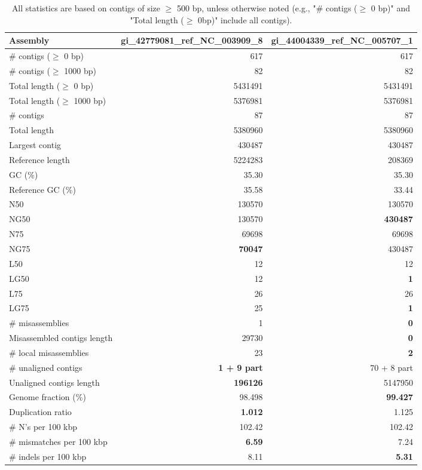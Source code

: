 \documentclass[12pt,a4paper]{article}
\begin{document}
\begin{table}[ht]
\begin{center}
\caption{All statistics are based on contigs of size $\geq$ 500 bp, unless otherwise noted (e.g., "\# contigs ($\geq$ 0 bp)" and "Total length ($\geq$ 0bp)" include all contigs).}
\begin{tabular}{|l*{2}{|r}|}
\hline
Assembly & gi\_42779081\_ref\_NC\_003909\_8 & gi\_44004339\_ref\_NC\_005707\_1 \\ \hline
\# contigs ($\geq$ 0 bp) & 617 & 617 \\ \hline
\# contigs ($\geq$ 1000 bp) & 82 & 82 \\ \hline
Total length ($\geq$ 0 bp) & 5431491 & 5431491 \\ \hline
Total length ($\geq$ 1000 bp) & 5376981 & 5376981 \\ \hline
\# contigs & 87 & 87 \\ \hline
Total length & 5380960 & 5380960 \\ \hline
Largest contig & 430487 & 430487 \\ \hline
Reference length & 5224283 & 208369 \\ \hline
GC (\%) & 35.30 & 35.30 \\ \hline
Reference GC (\%) & 35.58 & 33.44 \\ \hline
N50 & 130570 & 130570 \\ \hline
NG50 & 130570 & {\bf 430487} \\ \hline
N75 & 69698 & 69698 \\ \hline
NG75 & {\bf 70047} & 430487 \\ \hline
L50 & 12 & 12 \\ \hline
LG50 & 12 & {\bf 1} \\ \hline
L75 & 26 & 26 \\ \hline
LG75 & 25 & {\bf 1} \\ \hline
\# misassemblies & 1 & {\bf 0} \\ \hline
Misassembled contigs length & 29730 & {\bf 0} \\ \hline
\# local misassemblies & 23 & {\bf 2} \\ \hline
\# unaligned contigs & {\bf 1 + 9 part} & 70 + 8 part \\ \hline
Unaligned contigs length & {\bf 196126} & 5147950 \\ \hline
Genome fraction (\%) & 98.498 & {\bf 99.427} \\ \hline
Duplication ratio & {\bf 1.012} & 1.125 \\ \hline
\# N's per 100 kbp & 102.42 & 102.42 \\ \hline
\# mismatches per 100 kbp & {\bf 6.59} & 7.24 \\ \hline
\# indels per 100 kbp & 8.11 & {\bf 5.31} \\ \hline
\end{tabular}
\end{center}
\end{table}
\end{document}
